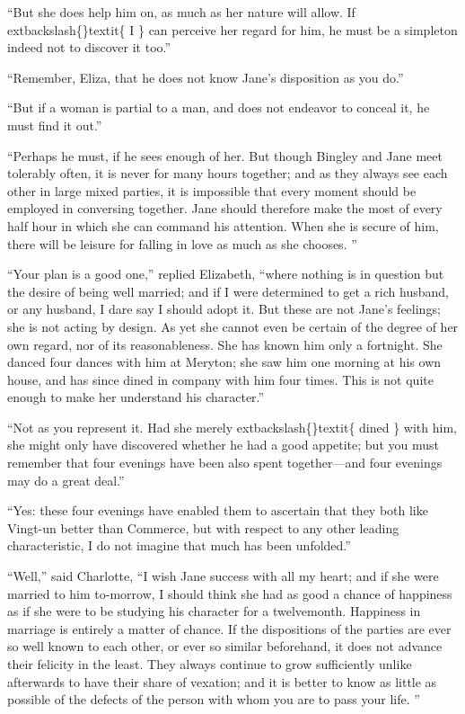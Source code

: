 \documentclass[10pt]{book}
\begin{document}
   “But she does help him on, as much as her nature will allow. If
   	extbackslash\{\}textit\{
    I
   \}
   can
perceive her regard for him, he must be a simpleton indeed not to
discover it too.”
  

   “Remember, Eliza, that he does not know Jane’s disposition as you do.”
  

   “But if a woman is partial to a man, and does not endeavor to conceal
it, he must find it out.”
  

   “Perhaps he must, if he sees enough of her. But though Bingley and Jane
meet tolerably often, it is never for many hours together; and as they
always see each other in large mixed parties, it is impossible that
every moment should be employed in conversing together. Jane should
therefore make the most of every half hour in which she can command his
attention. When she is secure of him, there will be leisure for falling
in love as much as she chooses.
   ”
  

   “Your plan is a good one,” replied Elizabeth, “where nothing is in
question but the desire of being well married; and if I were determined
to get a rich husband, or any husband, I dare say I should adopt it. But
these are not Jane’s feelings; she is not acting by design. As yet she
cannot even be certain of the degree of her own regard, nor of its
reasonableness. She has known him only a fortnight. She danced four
dances with him at Meryton; she saw him one morning at his own house,
and has since dined in company with him four times. This is not quite
enough to make her understand his character.”
  

   “Not as you represent it. Had she merely
   	extbackslash\{\}textit\{
    dined
   \}
   with him, she might
only have discovered whether he had a good appetite; but you must
remember that four evenings have been also spent together—and four
evenings may do a great deal.”
  

   “Yes: these four evenings have enabled them to ascertain that they both
like Vingt-un better than Commerce, but with respect to any other
leading characteristic, I do not imagine that much has been unfolded.”
  

   “Well,” said Charlotte, “I wish Jane success with all my heart; and if
she were married to him to-morrow, I should think she had as good a
chance of happiness as if she were to be studying his character for a
twelvemonth. Happiness in marriage is entirely a matter of chance. If
the dispositions of the parties are ever so well known to each other, or
ever so similar beforehand, it does not advance their felicity in the
least. They always continue to grow sufficiently unlike afterwards to
have their share of vexation; and it is better to know as little as
possible of the defects of the person with whom you are to pass your
life.
   ”
  
\end{document}
